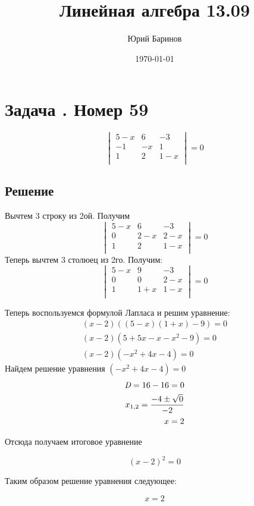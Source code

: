 \documentclass[titlepage]{article}
\title{Линейная алгебра 13.09}
\date{\today}
\author{Юрий Баринов}
\newcounter{ProblemNum}
\newcommand{\problem}[1]{
\stepcounter{ProblemNum}
\newpage
\section*{Задача \theProblemNum. #1}
}
\newcommand{\solution}{
	\subsection*{Решение}
}
\begin{document}
\maketitle{}
\problem{Номер 59}
\begin{equation}
	\begin{vmatrix}
		5-x & 6 & -3 \\
		-1 & -x & 1 \\
		1 & 2 & 1-x \\
	\end{vmatrix}
	= 0
\end{equation}
\solution{}
Вычтем 3 строку из 2ой. Получим
\begin{equation}
	\begin{vmatrix}
		5-x & 6 & -3 \\
		0 & 2-x & 2-x \\
		1 & 2 & 1-x \\
	\end{vmatrix}
	= 0
\end{equation}
Теперь вычтем 3 столюец из 2го. Получим:
\begin{equation}
	\begin{vmatrix}
		5-x & 9 & -3 \\
		0 & 0 & 2-x \\
		1 & 1+x & 1-x \\
	\end{vmatrix}
	= 0
\end{equation}

Теперь воспользуемся формулой Лапласа и решим уравнение: 
\begin{align}
(x-2)((5-x)(1+x) - 9) = 0 \\
(x-2)(5 + 5x - x -x^2 - 9) = 0 \\
(x-2)(-x^2 + 4x - 4) = 0
\end{align}
Найдем решение уравнения $(-x^2 + 4x - 4) = 0$ 
\begin{align}
	\emph{D} = 16 - 16 = 0 \\
	x_{1,2} = \frac{-4 \pm\sqrt{0}}{-2} \\
	x = 2	
\end{align}

Отсюда получаем итоговое уравнение


\begin{equation}
	(x-2)^2 = 0
\end{equation}

Таким образом решение уравнения следующее:

\begin{equation}
x = 2
\end{equation}
\end{document}
